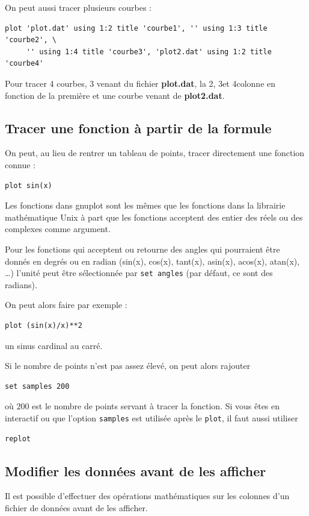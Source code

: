 \documentclass[a4paper,twoside]{article}
\begin{document}
\bigskip

On peut aussi tracer plusieurs courbes :
\begin{verbatim}
plot 'plot.dat' using 1:2 title 'courbe1', '' using 1:3 title 'courbe2', \
     '' using 1:4 title 'courbe3', 'plot2.dat' using 1:2 title 'courbe4'
\end{verbatim}
Pour tracer 4 courbes, 3 venant du fichier \textbf{plot.dat}, la 2\ieme, 3\ieme et 4\ieme colonne en fonction de la première et une courbe venant de \textbf{plot2.dat}.


\subsection{Tracer une fonction à partir de la formule}
On peut, au lieu de rentrer un tableau de points, tracer directement une fonction connue : 
\begin{verbatim}
plot sin(x)
\end{verbatim}

Les fonctions dans gnuplot sont les mêmes que les fonctions dans la librairie mathématique Unix à part que les fonctions acceptent des entier des réels ou des complexes comme argument. 

\begin{remarque}
Pour les fonctions qui acceptent ou retourne des angles qui pourraient être donnés en degrés ou en radian (sin(x), cos(x), tant(x), asin(x), acos(x), atan(x), \dots) l'unité peut être sélectionnée par \texttt{set angles} (par défaut, ce sont des radians).
\end{remarque}

On peut alors faire par exemple : 
\begin{verbatim}
plot (sin(x)/x)**2
\end{verbatim}
un sinus cardinal au carré.

Si le nombre de points n'est pas assez élevé, on peut alors rajouter
\begin{verbatim}
set samples 200
\end{verbatim}
où $200$ est le nombre de points servant à tracer la fonction. Si vous êtes en interactif ou que l'option \texttt{samples} est utilisée après le \texttt{plot}, il faut aussi utiliser
\begin{verbatim}
replot
\end{verbatim}

\subsection{Modifier les données avant de les afficher}
Il est possible d'effectuer des opérations mathématiques sur les colonnes d'un fichier de données avant de les afficher. 
\end{document}

